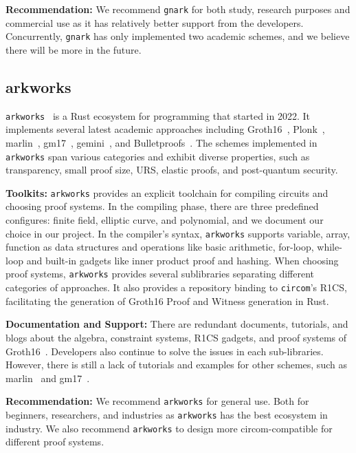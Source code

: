 \documentclass[letterpaper,twocolumn,10pt]{article}
\theoremstyle{definition}
\newcommand{\mypara}[1]{\noindent\textbf{{#1: }}}
\newcommand{\zk}{\text{zk-SNARK}\xspace}
\newcommand{\new}[1]{{#1}\xspace}
\newcommand{\lib}[1]{\texttt{#1}\xspace}
\begin{document}
\mypara{Recommendation} We recommend \lib{gnark} for both study, research purposes and commercial use as it has relatively better support from the developers. Concurrently, \lib{gnark} has only implemented two academic schemes, and we believe there will be more in the future.

\subsection{arkworks}
\lib{arkworks}~\cite{arkworks} is a Rust ecosystem for \zk programming that started in 2022. It implements several latest academic \zk approaches including Groth16~\cite{groth2016size}, Plonk~\cite{gabizon2019plonk}, marlin~\cite{chiesa2020marlin}, gm17~\cite{groth2017snarky}, gemini~\cite{bootle2022gemini}, and Bulletproofs~\cite{bunz2018bulletproofs}. The schemes implemented in \lib{arkworks} span various categories and exhibit diverse properties, such as transparency, small proof size, URS, elastic proofs, and post-quantum security.

\mypara{Toolkits} \lib{arkworks} provides an explicit toolchain for compiling circuits and choosing proof systems. In the compiling phase, there are three predefined configures: finite field, elliptic curve, and polynomial, and we document our choice in our project. \new{In the compiler's syntax, \lib{arkworks} supports variable, array, function as data structures and operations like basic arithmetic, for-loop, while-loop and built-in gadgets like inner product proof and hashing.}
When choosing proof systems, \lib{arkworks} provides several sublibraries separating different categories of \zk approaches. 
It also provides a repository binding to \texttt{circom}'s R1CS, facilitating the generation of Groth16 Proof and Witness generation in Rust.

\mypara{Documentation and Support} There are redundant documents, tutorials, and blogs about the algebra, constraint systems, R1CS gadgets, and proof systems of Groth16~\cite{groth2016size}. Developers also continue to solve the issues in each sub-libraries. However, there is still a lack of tutorials and examples for other \zk schemes, such as marlin~\cite{chiesa2020marlin} and gm17~\cite{groth2017snarky}.

\mypara{Recommendation} We recommend \lib{arkworks} for general use. Both for beginners, researchers, and industries as \lib{arkworks} has the best ecosystem in \zk industry. We also recommend \lib{arkworks} to design more circom-compatible for different proof systems. 
\end{document}
